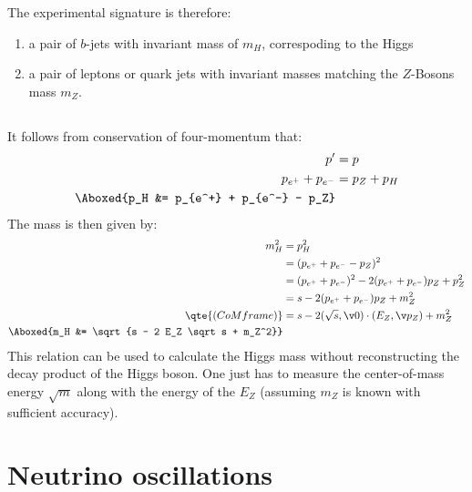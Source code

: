 \documentclass[exb]{exercise_5.0}
\begin{document}
The experimental signature is therefore:
\begin{enumerate}
    \item a pair of $b$-jets with invariant mass of $m_H$, correspoding to the Higgs 
    \item a pair of leptons or quark jets with invariant masses matching the $Z$-Bosons mass $m_Z$.
\end{enumerate}

\subsection{}
It follows from conservation of four-momentum that:
\begin{align*}
    p' &= p\\
    p_{e^+} + p_{e^-} &= p_Z + p_H\\
    \Aboxed{p_H &= p_{e^+} + p_{e^-} - p_Z}
\end{align*}
The mass is then given by:
\begin{align*}
    m_H^2 &= p_H^2\\
    &= (p_{e^+} + p_{e^-} - p_Z)^2\\
    &= (p_{e^+} + p_{e^-})^2 - 2(p_{e^+} + p_{e^-})p_Z + p_Z^2\\
    &= s - 2(p_{e^+} + p_{e^-})p_Z + m_Z^2\\
    \qte{(CoM frame)}&= s - 2(\sqrt s, \v 0)\cdot(E_Z, \v p_Z) + m_Z^2\\
    \Aboxed{m_H &= \sqrt{s - 2 E_Z \sqrt s + m_Z^2}}
\end{align*}
This relation can be used to calculate the Higgs mass without reconstructing the decay product of the Higgs boson. One just has to measure the center-of-mass energy $\sqrt m$ along with the energy of the $E_Z$ (assuming $m_Z$ is known with sufficient accuracy).

\section{Neutrino oscillations}
\end{document}
